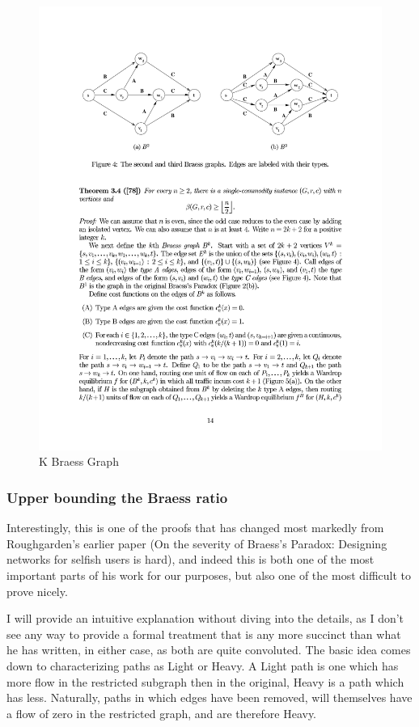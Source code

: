 \documentclass[a4paper,12pt]{article}
\begin{document}
\begin{figure}
  \includegraphics[width=\linewidth]{figures/optima.pdf}
  \caption{K Braess Graph}
  \label{fig:kbraess}
\end{figure}



\subsubsection*{Upper bounding the Braess ratio}

Interestingly, this is one of the proofs that has changed most markedly from Roughgarden's earlier paper (On the severity of Braess’s Paradox: Designing networks for selfish users is hard), and indeed this is both one of the most important parts of his work for our purposes, but also one of the most difficult to prove nicely.

I will provide an intuitive explanation without diving into the details, as I don't see any way to provide a formal treatment that is any more succinct than what he has written, in either case, as both are quite convoluted. The basic idea comes down to characterizing paths as Light or Heavy. A Light path is one which has more flow in the restricted subgraph then in the original, Heavy is a path which has less. Naturally, paths in which edges have been removed, will themselves have a flow of zero in the restricted graph, and are therefore Heavy.
\end{document}
